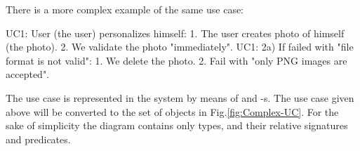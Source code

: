 \documentclass[12pt,oneside,letterpaper]{article}
\begin{document}
    There is a more complex example of the same use case:

    \begin{textcode}
    UC1: User (the user) personalizes himself:
      1. The user creates photo of himself (the photo).
      2. We validate the photo "immediately".
    UC1: 2a) If failed with "file format is not valid":
      1. We delete the photo.
      2. Fail with "only PNG images are accepted".
    \end{textcode}

    The use case is represented in the system by means of
     and -s. The
    use case given above will be converted to the set
    of objects in Fig.\ref{fig:Complex-UC}. For the sake of
    simplicity the diagram contains only  types, and
    their relative signatures and predicates.
\end{document}

